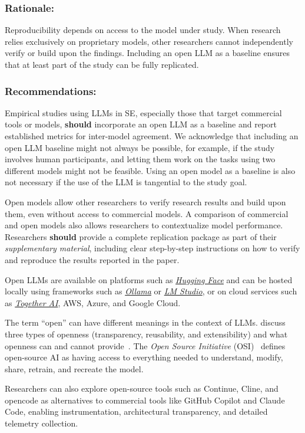 \documentclass[smallextended]{svjour3}
\newcommand{\should}{\textbf{should}\xspace}
\newcommand{\supplementarymaterial}{\emph{supplementary material}\xspace}
\newcommand{\supplementarymaterial}{\emph{supplementary material}\xspace}
\newcommand{\guidelinesubsubsection}[1]{\subsubsection{\bfseries #1:}}
\newcommand{\guidelinesubsubsection}[1]{\subsubsection{#1}}
\begin{document}
\guidelinesubsubsection{Rationale}

Reproducibility depends on access to the model under study.
When research relies exclusively on proprietary models, other researchers cannot independently verify or build upon the findings.
Including an open LLM as a baseline ensures that at least part of the study can be fully replicated.

\guidelinesubsubsection{Recommendations}

Empirical studies using LLMs in SE, especially those that target commercial tools or models, \should incorporate an open LLM as a baseline and report established metrics for inter-model agreement.
We acknowledge that including an open LLM baseline might not always be possible, for example, if the study involves human participants, and letting them work on the tasks using two different models might not be feasible.
Using an open model as a baseline is also not necessary if the use of the LLM is tangential to the study goal.

Open models allow other researchers to verify research results and build upon them, even without access to commercial models.
A comparison of commercial and open models also allows researchers to contextualize model performance.
Researchers \should provide a complete replication package as part of their \supplementarymaterial, including clear step-by-step instructions on how to verify and reproduce the results reported in the paper.

Open LLMs are available on platforms such as \href{https://huggingface.co/}{\emph{Hugging Face}} and can be hosted locally using frameworks such as \href{https://ollama.com/}{\emph{Ollama}} or \href{https://lmstudio.ai/}{\emph{LM Studio}}, or on cloud services such as \href{https://together.ai/}{\emph{Together AI}}, AWS, Azure, and Google Cloud.

The term ``open'' can have different meanings in the context of LLMs.
\citeauthor{widder2024open} discuss three types of openness (transparency, reusability, and extensibility) and what openness can and cannot provide~\cite{widder2024open}.
The \emph{Open Source Initiative} (OSI)~\cite{OSIAI2024} defines open-source AI as having access to everything needed to understand, modify, share, retrain, and recreate the model.

Researchers can also explore open-source tools such as Continue, Cline, and opencode as alternatives to commercial tools like GitHub Copilot and Claude Code, enabling instrumentation, architectural transparency, and detailed telemetry collection.
\end{document}
